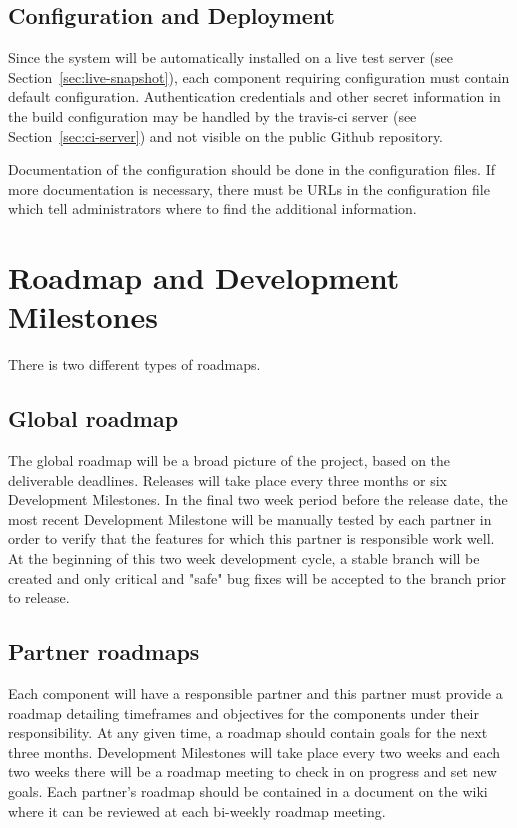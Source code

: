 \subsection{Configuration and Deployment}
\label{sec:deployment-process}

Since the system will be automatically installed on a live test server
(see Section~\ref{sec:live-snapshot}), each component requiring configuration must
contain default configuration. Authentication credentials and other secret information
in the build configuration may be handled by the
travis-ci server (see Section~\ref{sec:ci-server}) and not visible on the public Github repository.

Documentation of the configuration should be done in the configuration files. If more
documentation is necessary, there must be URLs in the configuration file which tell
administrators where to find the additional information.

\section{Roadmap and Development Milestones}
\label{sec:roadmap}

There is two different types of roadmaps.

\subsection{Global roadmap}
\label{sec:global-roadmap}

The global roadmap will be a broad picture of the project, based on the deliverable
deadlines. Releases will take place every three months or six Development Milestones.
In the final two week period before the release date, the most recent Development
Milestone will be manually tested by each partner in order to verify that the
features for which this partner is responsible work well. At the beginning of this
two week development cycle, a stable branch will be created and only critical and
"safe" bug fixes will be accepted to the branch prior to release.

\subsection{Partner roadmaps}
\label{sec:partner-roadmaps}

Each component will have a responsible partner and this partner must provide a roadmap
detailing timeframes and objectives for the components under their responsibility. At any
given time, a roadmap should contain goals for the next three months.
Development Milestones will take place every two weeks and each two weeks there will be
a roadmap meeting to check in on progress and set new goals. Each partner's roadmap
should be contained in a document on the wiki where it can be reviewed at each bi-weekly
roadmap meeting.


